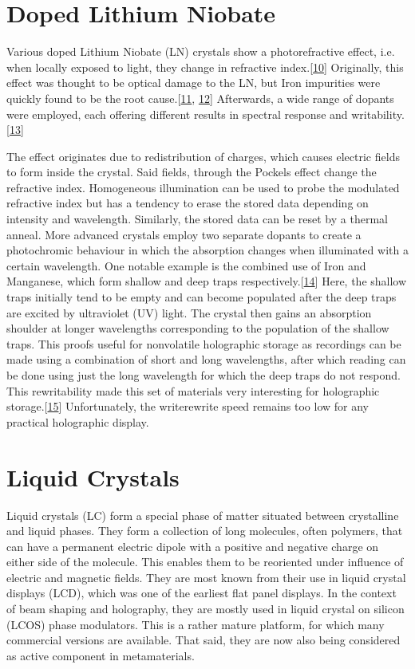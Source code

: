 \documentclass[a4paper,10pt,english,openany,oneside]{jupyterBook}
\begin{document}
\section{Doped Lithium Niobate}
\label{\detokenize{sota:doped-lithium-niobate}}
\sphinxAtStartPar
Various doped Lithium Niobate (LN) crystals show a photorefractive effect, i.e. when locally exposed to light, they change in refractive index.{[}\hyperlink{cite.bib:id331}{10}{]} Originally, this effect was thought to be optical damage to the LN, but Iron impurities were quickly found to be the root cause.{[}\hyperlink{cite.bib:id333}{11}, \hyperlink{cite.bib:id233}{12}{]} Afterwards, a wide range of dopants were employed, each offering different results in spectral response and writability.{[}\hyperlink{cite.bib:id232}{13}{]}

\sphinxAtStartPar
The effect originates due to redistribution of charges, which causes electric fields to form inside the crystal. Said fields, through the Pockels effect change the refractive index. Homogeneous illumination can be used to probe the modulated refractive index but has a tendency to erase the stored data depending on intensity and wavelength. Similarly, the stored data can be reset by a thermal anneal. More advanced crystals employ two separate dopants to create a photochromic behaviour in which the absorption changes when illuminated with a certain wavelength. One notable example is the combined use of Iron and Manganese, which form shallow and deep traps respectively.{[}\hyperlink{cite.bib:id311}{14}{]} Here, the shallow traps initially tend to be empty and can become populated after the deep traps are excited by ultraviolet (UV) light. The crystal then gains an absorption shoulder at longer wavelengths corresponding to the population of the shallow traps. This proofs useful for nonvolatile holographic storage as recordings can be made using a combination of short and long wavelengths, after which reading can be done using just the long wavelength for which the deep traps do not respond. This re\sphinxhyphen{}writability made this set of materials very interesting for holographic storage.{[}\hyperlink{cite.bib:id94}{15}{]} Unfortunately, the write\sphinxhyphen{}rewrite speed remains too low for any practical holographic display.


\section{Liquid Crystals}
\label{\detokenize{sota:liquid-crystals}}
\sphinxAtStartPar
Liquid crystals (LC) form a special phase of matter situated between crystalline and liquid phases. They form a collection of long molecules, often polymers, that can have a permanent electric dipole with a positive and negative charge on either side of the molecule. This enables them to be reoriented under influence of electric and magnetic fields. They are most known from their use in liquid crystal displays (LCD), which was one of the earliest flat panel displays. In the context of beam shaping and holography, they are mostly used in liquid crystal on silicon (LCOS) phase modulators. This is a rather mature platform, for which many commercial versions are available. That said, they are now also being considered as active component in metamaterials.
\end{document}
